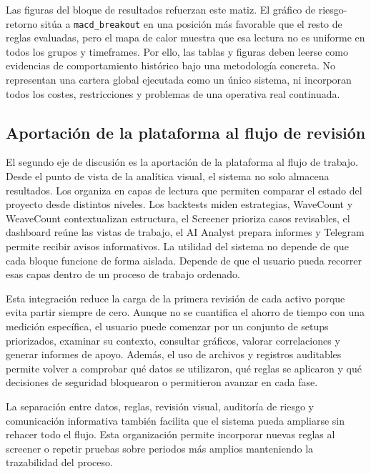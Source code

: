 Las figuras del bloque de resultados refuerzan este matiz. El gr\'afico de
riesgo-retorno sit\'ua a \texttt{macd\_breakout} en una posici\'on m\'as favorable
que el resto de reglas evaluadas, pero el mapa de calor muestra que esa lectura
no es uniforme en todos los grupos y timeframes. Por ello, las tablas y
figuras deben leerse como evidencias de comportamiento hist\'orico bajo una
metodolog\'ia concreta. No representan una cartera global ejecutada como un
\'unico sistema, ni incorporan todos los costes, restricciones y problemas de una
operativa real continuada.

\subsection{Aportaci\'on de la plataforma al flujo de revisi\'on}
\label{subsec:discusion-plataforma}

El segundo eje de discusi\'on es la aportaci\'on de la plataforma al flujo de
trabajo. Desde el punto de vista de la anal\'itica visual, el sistema no solo
almacena resultados. Los organiza en capas de lectura que permiten comparar el
estado del proyecto desde distintos niveles. Los backtests miden estrategias,
WaveCount y WeaveCount contextualizan estructura, el Screener prioriza casos
revisables, el dashboard re\'une las vistas de trabajo, el AI Analyst prepara
informes y Telegram permite recibir avisos informativos. La utilidad del sistema
no depende de que cada
bloque funcione de forma aislada. Depende de que el usuario pueda recorrer esas
capas dentro de un proceso de trabajo ordenado.

Esta integraci\'on reduce la carga de la primera revisi\'on de cada activo
porque evita partir siempre de cero. Aunque no se cuantifica el ahorro de
tiempo con una medici\'on espec\'ifica, el usuario puede comenzar por un
conjunto de setups priorizados, examinar su contexto, consultar gr\'aficos, valorar
correlaciones y generar informes de apoyo. Adem\'as, el uso de archivos y
registros auditables permite volver a comprobar qu\'e datos se utilizaron, qu\'e
reglas se aplicaron y qu\'e decisiones de seguridad bloquearon o permitieron
avanzar en cada fase.

La separaci\'on entre datos, reglas, revisi\'on visual, auditor\'ia de riesgo y
comunicaci\'on informativa tambi\'en facilita que el sistema pueda ampliarse sin
rehacer todo el flujo. Esta organizaci\'on permite incorporar nuevas reglas al
screener o repetir pruebas sobre periodos m\'as amplios manteniendo la
trazabilidad del proceso.


